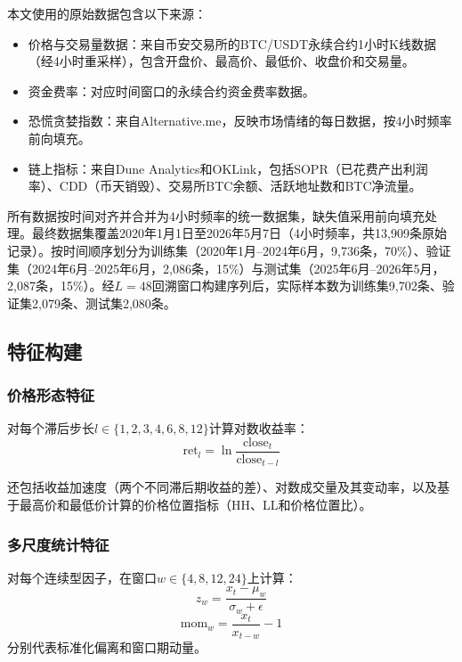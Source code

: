 \documentclass[12pt,a4paper]{ctexart}
\begin{document}
本文使用的原始数据包含以下来源：

\begin{itemize}[leftmargin=2.5em]
    \item 价格与交易量数据：来自币安交易所的BTC/USDT永续合约1小时K线数据（经4小时重采样），包含开盘价、最高价、最低价、收盘价和交易量。
    \item 资金费率：对应时间窗口的永续合约资金费率数据。
    \item 恐慌贪婪指数：来自Alternative.me，反映市场情绪的每日数据，按4小时频率前向填充。
    \item 链上指标：来自Dune Analytics和OKLink，包括SOPR（已花费产出利润率）、CDD（币天销毁）、交易所BTC余额、活跃地址数和BTC净流量。
\end{itemize}

所有数据按时间对齐并合并为4小时频率的统一数据集，缺失值采用前向填充处理。最终数据集覆盖2020年1月1日至2026年5月7日（4小时频率，共13,909条原始记录）。按时间顺序划分为训练集（2020年1月--2024年6月，9,736条，70\%）、验证集（2024年6月--2025年6月，2,086条，15\%）与测试集（2025年6月--2026年5月，2,087条，15\%）。经$L=48$回溯窗口构建序列后，实际样本数为训练集9,702条、验证集2,079条、测试集2,080条。

\subsection{特征构建}

\subsubsection{价格形态特征}

对每个滞后步长$l \in \{1,2,3,4,6,8,12\}$计算对数收益率：
\begin{equation}
\text{ret}_l = \ln \frac{\text{close}_t}{\text{close}_{t-l}}
\end{equation}

还包括收益加速度（两个不同滞后期收益的差）、对数成交量及其变动率，以及基于最高价和最低价计算的价格位置指标（HH、LL和价格位置比）。

\subsubsection{多尺度统计特征}

对每个连续型因子，在窗口$w \in \{4,8,12,24\}$上计算：
\begin{equation}
z_w = \frac{x_t - \mu_w}{\sigma_w + \epsilon}
\end{equation}
\begin{equation}
\text{mom}_w = \frac{x_t}{x_{t-w}} - 1
\end{equation}
分别代表标准化偏离和窗口期动量。
\end{document}
